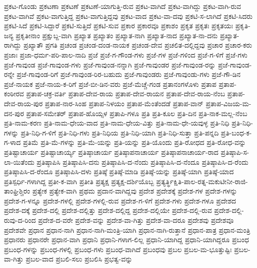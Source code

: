 {ಪ್ರಕಟ-ಗೊಂಡು
ಪ್ರಕಟಣಾ
ಪ್ರಕಟಣೆ
ಪ್ರಕಟಣೆ-ಯಾಗುತ್ತಿ-ರುವ
ಪ್ರಕಟ-ವಾಗಿದೆ
ಪ್ರಕಟ-ವಾಗಿದ್ದು
ಪ್ರಕಟ-ವಾಗಿ-ರುವ
ಪ್ರಕಟ-ವಾಗಿವೆ
ಪ್ರಕಟ-ವಾಗುತ್ತಿದ್ದ
ಪ್ರಕಟ-ವಾಗುತ್ತಿದ್ದವು
ಪ್ರಕಟ-ವಾದ
ಪ್ರಕಟ-ವಾ-ದವು
ಪ್ರಕಟಿ-ಸ-ಲಾಗಿದೆ
ಪ್ರಕಟಿ-ಸಿದರು
ಪ್ರಕಟಿ-ಸಿದೆ
ಪ್ರಕಟಿ-ಸಿದ್ದಾರೆ
ಪ್ರಕಟಿ-ಸುತ್ತಿದೆ
ಪ್ರಕಟಿ-ಸುವ
ಪ್ರಕಾರ
ಪ್ರಕಾರವೂ
ಪ್ರಕಾಶಂ
ಪ್ರಕೃತ
ಪ್ರಕೃತಃ
ಪ್ರಕೃತಯಃ
ಪ್ರಕೃತಿ-ಜನ್ಯ
ಪ್ರಕೃತೀನಾಂ
ಪ್ರಕ್ಷುಬ್ದ-ವಾಗಿ
ಪ್ರಖ್ಯಾತ
ಪ್ರಖ್ಯಾತಂ
ಪ್ರಖ್ಯಾತ-ನಾಗಿ
ಪ್ರಖ್ಯಾತ-ನಾದ
ಪ್ರಖ್ಯಾತ-ನಾ-ದನು
ಪ್ರಖ್ಯಾತ-ರಾಗಿದ್ದು
ಪ್ರಖ್ಯಾತೌ
ಪ್ರಗತಿ
ಪ್ರಚಂಡ
ಪ್ರಚಂಡ-ದಂಡ-ನಾಯಕ
ಪ್ರಚಂಡ-ದೇವ
ಪ್ರಚಲಿತ-ದಲ್ಲಿದ್ದವು
ಪ್ರಚಾರ
ಪ್ರಚಾರ-ಕರು
ಪ್ರಜಾಃ
ಪ್ರಜಾ-ಧರ್ಮ-ಪರಿ-ಪಾಲ-ನಾದಿ
ಪ್ರಜೆ
ಪ್ರಜೆ-ಗ-ಗೌಂಡ-ಗಳು
ಪ್ರಜೆ-ಗಳ
ಪ್ರಜೆ-ಗಳಿಂದ
ಪ್ರಜೆ-ಗ-ಳಿಗೆ
ಪ್ರಜೆ-ಗಳು
ಪ್ರಜೆ-ಗಾವುಂಡ
ಪ್ರಜೆ-ಗಾವುಂಡ-ಗಳು
ಪ್ರಜೆ-ಗಾವುಂಡ-ನನ್ನಾಗಿ
ಪ್ರಜೆ-ಗಾವುಂಡರ
ಪ್ರಜೆ-ಗಾವುಂಡ-ರನ್ನು
ಪ್ರಜೆ-ಗಾವುಂಡ-ರನ್ನೇ
ಪ್ರಜೆ-ಗಾವುಂಡ-ರಿಗೆ
ಪ್ರಜೆ-ಗಾವುಂಡ-ರಿರ-ಬಹುದು
ಪ್ರಜೆ-ಗಾವುಂಡರು
ಪ್ರಜೆ-ಗಾವುಂಡು-ಗಳು
ಪ್ರಜೆ-ಗೌ-ಡಿನ
ಪ್ರಜೆ-ನಾಯಕ
ಪ್ರಜೆ-ನಾಯ-ಕ-ರಿಗೆ
ಪ್ರಜೆ-ಬೀ-ಡಿನ-ವರು
ಪ್ರಜೆ-ಮೆಚ್ಚೆ-ಗಂಡ
ಪ್ರತಾನಂಗಳೊಳು
ಪ್ರತಾಪ
ಪ್ರತಾಪ-ಕಂಠೀರವ
ಪ್ರತಾಪ-ಚಕ್ರ-ವರ್ತಿ
ಪ್ರತಾಪ-ದೇವ-ರಾಯ
ಪ್ರತಾಪ-ದೇವ-ರಾಯನ
ಪ್ರತಾಪ-ದೇವ-ರಾಯ-ನೆಂಬ
ಪ್ರತಾಪ-ದೇವ-ರಾಯ-ಪುರ
ಪ್ರತಾಪ-ನಾರ-ಸಿಂಹ
ಪ್ರತಾಪ-ನಿಳಯಂ
ಪ್ರತಾಪ-ಮೆಂತೆಂದಡೆ
ಪ್ರತಾಪ-ವಾನ್
ಪ್ರತಾಪ-ವಿಜಯ-ಮ-ದನ-ಪುರ
ಪ್ರತಾಪ-ಸಮೇತರ್
ಪ್ರತಾಪ-ಹೊಯ್ಸಳ
ಪ್ರತಾಪಿ-ಗಳೂ
ಪ್ರತಿ
ಪ್ರತಿ-ಕೂಲ
ಪ್ರತಿ-ದಿನ
ಪ್ರತಿ-ನಾಕ-ಮಲ್ಲ-ನೆಂಬ
ಪ್ರತಿ-ನಾಮ-ಕರಣ
ಪ್ರತಿ-ನಾಮ-ಧೇಯ-ವಾದ
ಪ್ರತಿ-ನಾಮ-ಧೇಯ-ವಿತ್ತು
ಪ್ರತಿ-ನಾಮ-ಧೇ-ಯವುಳ್ಳ
ಪ್ರತಿ-ನಿಧಿ
ಪ್ರತಿ-ನಿಧಿ-ಗಳನ್ನು
ಪ್ರತಿ-ನಿಧಿ-ಗ-ಳಿಗೆ
ಪ್ರತಿ-ನಿಧಿ-ಗಳು
ಪ್ರತಿ-ನಿಧಿಯ
ಪ್ರತಿ-ನಿಧಿ-ಯಾಗಿ
ಪ್ರತಿ-ನಿಧಿ-ಸುತ್ತಾ
ಪ್ರತಿ-ಪನ್ನದಿ
ಪ್ರತಿ-ಬಂಧ-ಕ-ಗ-ಳಾದ
ಪ್ರತಿಮೆ
ಪ್ರತಿ-ಮೆ-ಗಳನ್ನು
ಪ್ರತಿ-ಮೆ-ಯನ್ನು
ಪ್ರತಿ-ಯನ್ನು
ಪ್ರತಿ-ಯೊಂದು
ಪ್ರತಿ-ರೋಧದ
ಪ್ರತಿ-ರೋಧ-ವನ್ನು
ಪ್ರತಿಷ್ಟಾಚಾರ್ಯ
ಪ್ರತಿಷ್ಟಾಚಾರ್ಯ್ಯ
ಪ್ರತಿಷ್ಠಾಚಾರ್ಯ
ಪ್ರತಿಷ್ಠಾಪನಾಚಾರ್ಯ
ಪ್ರತಿಷ್ಠಾಪನಾಚಾರ್ಯ-ರಾದ
ಪ್ರತಿಷ್ಠಾಪಿ-ಸ-ಲಾ-ಯಿತೆಂದು
ಪ್ರತಿಷ್ಠಾಪಿಸಿ
ಪ್ರತಿಷ್ಠಾಪಿಸಿ-ದನು
ಪ್ರತಿಷ್ಠಾಪಿಸಿ-ದ-ನೆಂದು
ಪ್ರತಿಷ್ಠಾಪಿಸಿ-ದ-ನೆಂದೂ
ಪ್ರತಿಷ್ಠಾಪಿಸಿ-ದ-ರೆಂದು
ಪ್ರತಿಷ್ಠಾಪಿಸಿ-ದ-ರೆಂದೂ
ಪ್ರತಿಷ್ಠಾಪಿಸಿ-ದಳು
ಪ್ರತಿಷ್ಠೆ
ಪ್ರತಿಷ್ಠೆ-ಮಾಡಿ
ಪ್ರತಿಷ್ಠೆ-ಯನ್ನು
ಪ್ರತಿಷ್ಠೆ-ಯಾಗಿ
ಪ್ರತಿಷ್ಠೆ-ಯಾದ
ಪ್ರತಿಸ್ಪರ್ಧಿ-ಗಳಾಗಿದ್ದ
ಪ್ರತೀ-ಕ-ವಾಗಿ
ಪ್ರತೀತಿ
ಪ್ರತ್ಯಕ್ಷ
ಪ್ರತ್ಯಕ್ಷ-ದರ್ಶಿಯೊಬ್ಬ
ಪ್ರತ್ಯರ್ತ್ಥಿಕ್ಷಿತಿ-ಪಾಲ-ರತ್ನ-ಮಕುಟೀನೀ-ರಾಜಿ-ತಾಂಘ್ರಿಶ್ಚಿರಂ
ಪ್ರತ್ಯೇಕ
ಪ್ರತ್ಯೇಕ-ವಾಗಿ
ಪ್ರಥಮ
ಪ್ರದಾನ-ವಾಗಿದ್ದವು
ಪ್ರದೇಶ
ಪ್ರದೇಶಕ್ಕೆ
ಪ್ರದೇಶ-ಗಳ
ಪ್ರದೇಶ-ಗಳನ್ನು
ಪ್ರದೇಶ-ಗ-ಳನ್ನೂ
ಪ್ರದೇಶ-ಗಳಲ್ಲಿ
ಪ್ರದೇಶ-ಗಳಲ್ಲಿ-ರುವ
ಪ್ರದೇಶ-ಗ-ಳಿಗೆ
ಪ್ರದೇಶ-ಗಳು
ಪ್ರದೇಶ-ಗಳೂ
ಪ್ರದೇಶದ
ಪ್ರದೇಶ-ದಕ್ಕೆ
ಪ್ರದೇಶ-ದಲ್ಲಿ
ಪ್ರದೇಶ-ದಲ್ಲಿತ್ತು
ಪ್ರದೇಶ-ದಲ್ಲಿದ್ದ
ಪ್ರದೇಶ-ದಲ್ಲಿಯೇ
ಪ್ರದೇಶ-ದಲ್ಲಿ-ರುವ
ಪ್ರದೇಶ-ದಲ್ಲಿ-ರುವು-ದ-ರಿಂದ
ಪ್ರದೇಶ-ದ-ವರೇ
ಪ್ರದೇಶ-ವನ್ನು
ಪ್ರದೇಶ-ವಾ-ಗಿತ್ತು
ಪ್ರದೇಶ-ವಾ-ದರೂ
ಪ್ರದೇಶವು
ಪ್ರದೇಶವೂ
ಪ್ರದೇಶವೇ
ಪ್ರಧಾನ
ಪ್ರಧಾನ-ನಾಗಿ
ಪ್ರಧಾನ-ನಾಗಿ-ಮಂತ್ರಿ-ಯಾಗಿ
ಪ್ರಧಾನ-ನಾಗಿ-ರುತ್ತಾನೆ
ಪ್ರಧಾನ-ಪಾತ್ರ
ಪ್ರಧಾನ-ಮಂತ್ರಿ
ಪ್ರಧಾನರು
ಪ್ರಧಾನರೇ
ಪ್ರಧಾನ-ವಾಗಿ
ಪ್ರಧಾನಿ
ಪ್ರಧಾನಿ-ಗಳಾಗ-ಲಿಲ್ಲ
ಪ್ರಧಾನಿ-ಯಾಗಿದ್ದ
ಪ್ರಧಾನಿ-ಯಾಗಿದ್ದರೂ
ಪ್ರಬಂಧ
ಪ್ರಬಂಧ-ಗಳನ್ನು
ಪ್ರಬಂಧ-ಗಳಲ್ಲಿ
ಪ್ರಬಂಧ-ಗಳು
ಪ್ರಬಂಧ-ವಾಗಿದೆ
ಪ್ರಬಂಧವು
ಪ್ರಬಲ
ಪ್ರಬಲ-ಮ-ಭೂತ್ತುಷ್ಟಿಃ
ಪ್ರಬಲ-ವಾ-ಗಿತ್ತು
ಪ್ರಬಲ-ವಾದ
ಪ್ರಬಲಿ-ಸಲು
ಪ್ರಬಲಿಸಿ
ಪ್ರಭತ್ವ-ವನ್ನು
}
